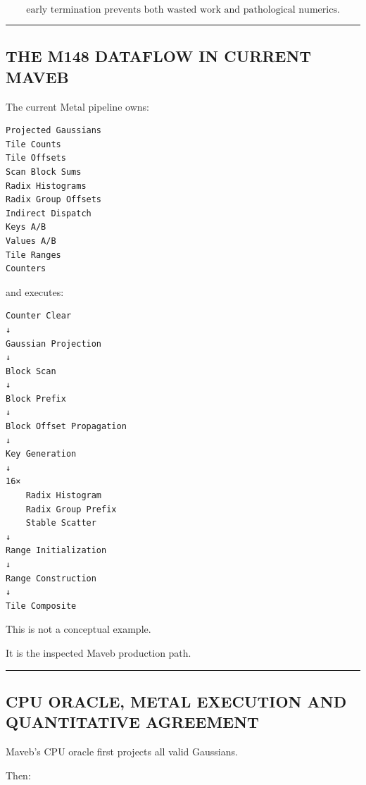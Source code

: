\[
\boxed{
\text{early termination prevents both wasted work and pathological numerics}.
}
\]

\begin{center}\rule{0.5\linewidth}{0.5pt}\end{center}

\subsection{THE M148 DATAFLOW IN CURRENT MAVEB}\label{04-visual-computing-ii-ch039-the-m148-dataflow-in-current-maveb}

\hypertarget{04-visual-computing-ii-ch039-the-m148-dataflow-in-current-maveb}{}

The current Metal pipeline owns:

\protect{}\label{f7zvxr}%
\begin{verbatim}
Projected Gaussians
Tile Counts
Tile Offsets
Scan Block Sums
Radix Histograms
Radix Group Offsets
Indirect Dispatch
Keys A/B
Values A/B
Tile Ranges
Counters
\end{verbatim}

and executes:

\protect{}\label{1ly8ek}%
\begin{verbatim}
Counter Clear
↓
Gaussian Projection
↓
Block Scan
↓
Block Prefix
↓
Block Offset Propagation
↓
Key Generation
↓
16×
    Radix Histogram
    Radix Group Prefix
    Stable Scatter
↓
Range Initialization
↓
Range Construction
↓
Tile Composite
\end{verbatim}

This is not a conceptual example.

It is the inspected Maveb production path.

\begin{center}\rule{0.5\linewidth}{0.5pt}\end{center}

\subsection{CPU ORACLE, METAL EXECUTION AND QUANTITATIVE AGREEMENT}\label{04-visual-computing-ii-ch039-cpu-oracle-metal-execution-and-quantitative-agreement}

\hypertarget{04-visual-computing-ii-ch039-cpu-oracle-metal-execution-and-quantitative-agreement}{}

Maveb's CPU oracle first projects all valid Gaussians.

Then:

